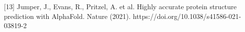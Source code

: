 \documentclass{article}
\begin{document}
[13] Jumper, J., Evans, R., Pritzel, A. et al. Highly accurate protein structure prediction with AlphaFold. Nature (2021). https://doi.org/10.1038/s41586-021-03819-2












\end{document}
